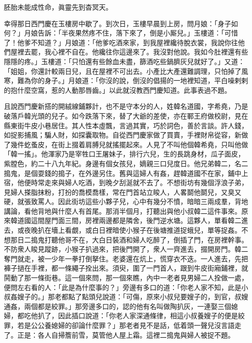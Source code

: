 \begin{myquote} 
胚胎未能成性命，眞靈先到杳冥天。
\end{myquote} 

幸得那日西門慶在玉樓房中歇了。到次日，玉樓早晨到上房，問月娘：「身子如何？」月娘告訴：「半夜果然疼不住，落下來了，倒是小厮兒。」玉樓道：「可惜了！他爹不知道？」月娘道：「他爹吃酒來家，到我屋裡纔待脫衣裳，我說你往他們屋裡去罷，我心裡不自在。他纔往你這邊來了。我沒對他說。我如今肚裡還有些隱隱的疼。」玉樓道：「只怕還有些餘血未盡，篩酒吃些鍋臍灰兒就好了。」又道：「姐姐，你還計較兩日兒，且在屋裡不可出去。小產比大產還難調理，只怕掉了風寒，難為你的身子。」月娘道：「你沒的說，倒沒的倡揚的一地裡知道，平白噪剌剌的抱什麼空窩，惹的人動那唇齒。」{}以此就沒教西門慶知道。此事表過不題。

且說西門慶新搭的開絨線鋪夥計，也不是守本分的人，姓韓名道國，字希堯，乃是破落戶韓光頭的兒子。如今跌落下來，替了大爺的差使，亦在鄆王府做校尉，見在縣東街牛皮小巷居住。其人性本虛飄，言過其實，巧於詞色，善於言談。許人錢，如捉影捕風；騙人財，如探囊取物。自從西門慶家做了買賣，手裡財帛從容，新做了幾件虼蚤皮，在街上掇着肩膊兒就搖擺起來。人見了不叫他個韓希堯，只叫他做「韓一搖」。他渾家乃是宰牲口王屠妹子，排行六兒，生的長跳身材，瓜子面皮，紫膛色，約二十八九年紀。身邊有個女孩兒，嫡親三口兒度日。他兄弟韓二，名二搗鬼，是個耍錢的搗子，在外邊另住。舊與這婦人有姦，趕韓道國不在家，鋪中上宿，他便時常走來與婦人吃酒，到晚夕刮涎就不去了。不想街坊有幾個浮浪子弟，見婦人搽脂抹粉，打扮的喬模喬樣，常在門首站立睃人，人畧鬬他鬬兒，又臭又硬，就張致罵人。因此街坊這些小夥子兒，心中有幾分不憤，暗暗三兩成羣，背地講論，看他背地與什麼人有首尾。那消半個月，打聽出與他小叔韓二這件事來。原來韓道國這間屋門面三間，房裡兩邊都是隣舍，後門逆水塘。這夥人，單看韓二進去，或夜晚扒在墻上看覷，或白日裡暗使小猴子在後塘推道捉蛾兒，單等捉姦。不想那日二搗鬼打聽他哥不在，大白日裝酒和婦人吃醉了，倒插了門，在房裡幹事。不防衆人睃見蹤跡，小猴子扒過來，把後門開了，衆人一齊進去，掇開房門。韓二奪門就走，被一少年一拳打倒拏住。老婆還在炕上，慌穿衣不迭。一人進去，先把褲子撾在手裡，都一條繩子拴出來。{}須臾，圍了一門首人，跟到牛皮街廂鋪裡，就鬨動了那一條街巷。這一個來問，那一個來瞧，內中一老者見男婦二人拴做一處，便問左右看的人：「此是為什麼事的？」旁邊有多口的道：「你老人家不知，此是小叔姦嫂子的。」那老都點了點頭兒說道：「可傷，原來小叔兒要嫂子的，到官，叔嫂通姦，兩個都是絞罪。」那旁邊多口的，認的他有名叫做陶扒灰，一連娶三個媳婦，都吃他扒了，因此插口說道：「你老人家深通條律，相這小叔養嫂子的便是絞罪，若是公公養媳婦的卻論什麼罪？」那老者見不是話，低着頭一聲兒沒言語走了。{}正是：各人自掃簷前雪，莫管他人屋上霜。這裡二搗鬼與婦人被捉不題。

